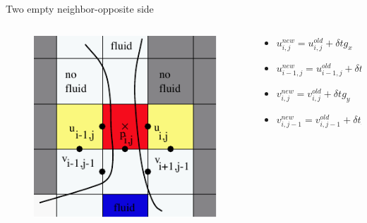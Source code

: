 \documentclass{beamer}
\begin{document}
	\begin{frame}{Two empty neighbor-opposite side}
	  \begin{columns}
	 	\begin{column}[c]{0.4\textwidth}
	 	\begin{figure}
			\includegraphics[width=1\textwidth]{pic/two2.pdf}
		 \end{figure}
		\end{column}
		\begin{column}[c]{0.6\textwidth}
				\begin{itemize}
					\item $ u_{i,j}^{new}= u_{i,j}^{old} +\delta t g_x $
					\item $ u_{i-1,j}^{new}= u_{i-1,j}^{old} +\delta t g_x $
					\item $ v_{i,j}^{new}= v_{i,j}^{old} +\delta t g_y $
					\item $ v_{i,j-1}^{new}= v_{i,j-1}^{old} +\delta t g_y $
				\end{itemize}
			\end{column}
		\end{columns}
	\end{frame}	
	
\end{document}
